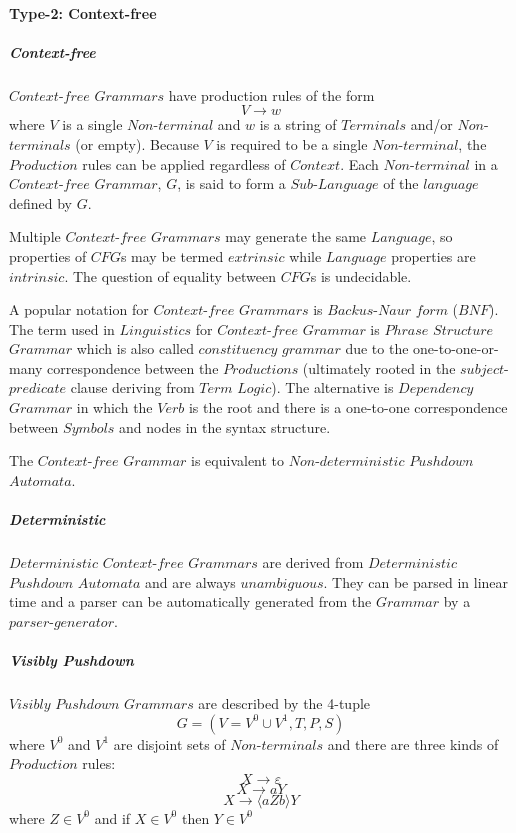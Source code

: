 \documentclass{article}
\begin{document}
\paragraph{Type-2: Context-free}

    \subparagraph{Context-free}
    $Context$-$free$ $Grammars$ have production rules of the form
    \[
        V \rightarrow w
    \]
    where $V$ is a single $Non$-$terminal$ and $w$ is a string of
    $Terminals$ and/or $Non$-$terminals$ (or empty). Because $V$ is
    required to be a single $Non$-$terminal$, the $Production$ rules
    can be applied regardless of $Context$. Each $Non$-$terminal$ in a
    $Context$-$free$ $Grammar$, $G$, is said to form a
    $Sub$-$Language$ of the $language$ defined by $G$.

    Multiple $Context$-$free$ $Grammars$ may generate the same
    $Language$, so properties of $CFG$s may be termed $extrinsic$
    while $Language$ properties are $intrinsic$. The question of
    equality between $CFG$s is undecidable.

    A popular notation for $Context$-$free$ $Grammars$ is
    $Backus$-$Naur$ $form$ ($BNF$). The term used in $Linguistics$ for
    $Context$-$free$ $Grammar$ is $Phrase$ $Structure$ $Grammar$ which
    is also called $constituency$ $grammar$ due to the
    one-to-one-or-many correspondence between the $Productions$
    (ultimately rooted in the $subject$-$predicate$ clause deriving
    from $Term$ $Logic$). The alternative is $Dependency$ $Grammar$ in
    which the $Verb$ is the root and there is a one-to-one
    correspondence between $Symbols$ and nodes in the syntax
    structure.

    The $Context$-$free$ $Grammar$ is equivalent to
    $Non$-$deterministic$ $Pushdown$ $Automata$.

    \subparagraph{Deterministic}
    $Deterministic$ $Context$-$free$ $Grammars$ are derived from
    $Deterministic$ $Pushdown$ $Automata$ and are always
    $unambiguous$. They can be parsed in linear time and a parser can
    be automatically generated from the $Grammar$ by a
    $parser$-$generator$.

    \subparagraph{Visibly Pushdown}
    $Visibly$ $Pushdown$ $Grammars$ are described by the 4-tuple
    \[
        G = (V=V^0 \cup V^1,T,P,S)
    \]
    where $V^0$ and $V^1$ are disjoint sets of $Non$-$terminals$ and
    there are three kinds of $Production$ rules:
    \[
        X \rightarrow \varepsilon
    \]\[
        X \rightarrow aY
    \]\[
        X \rightarrow \langle aZb \rangle Y
    \]
    where $Z \in V^0$ and if $X \in V^0$ then $Y \in V^0$
\end{document}
